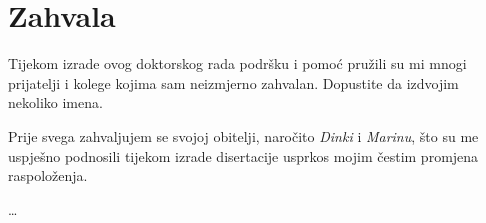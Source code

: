 \chapter*{Zahvala}

Tijekom izrade ovog doktorskog rada podršku i pomoć pružili
su mi mnogi prijatelji i kolege kojima sam neizmjerno zahvalan.
Dopustite da izdvojim nekoliko imena.

Prije svega zahvaljujem se svojoj obitelji, naročito \textit{Dinki}
i \textit{Marinu}, što su me uspješno podnosili tijekom izrade disertacije
usprkos mojim čestim promjena raspoloženja.

\ldots

